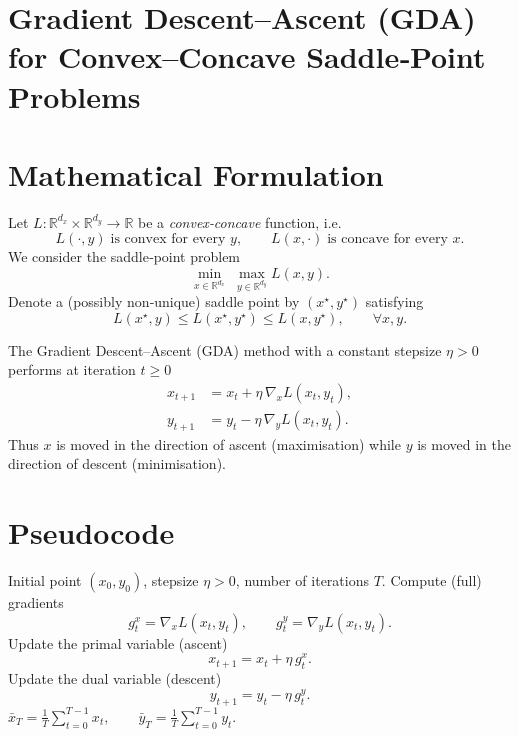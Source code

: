 \documentclass{article}
\begin{document}
\section*{Gradient Descent–Ascent (GDA) for Convex–Concave Saddle‑Point Problems}

\section*{Mathematical Formulation}
Let $L:\mathbb{R}^{d_x}\times\mathbb{R}^{d_y}\rightarrow\mathbb{R}$ be a \emph{convex‑concave} function, i.e.
\[
L(\cdot ,y)\;\text{is convex for every }y,\qquad 
L(x,\cdot )\;\text{is concave for every }x .
\]
We consider the saddle‑point problem
\[
\min_{x\in\mathbb{R}^{d_x}}\;\max_{y\in\mathbb{R}^{d_y}} L(x,y).
\]
Denote a (possibly non‑unique) saddle point by $(x^{\star},y^{\star})$ satisfying
\[
L(x^{\star},y)\le L(x^{\star},y^{\star})\le L(x,y^{\star}),\qquad \forall x,y.
\]

The Gradient Descent–Ascent (GDA) method with a constant stepsize $\eta>0$ performs at iteration $t\ge 0$
\begin{align}
x_{t+1} &= x_t + \eta \,\nabla_{x}L(x_t,y_t),\label{eq:xupdate}\\
y_{t+1} &= y_t - \eta \,\nabla_{y}L(x_t,y_t).\label{eq:yupdate}
\end{align}
Thus $x$ is moved in the direction of ascent (maximisation) while $y$ is moved in the direction of descent (minimisation).  

\section*{Pseudocode}
\begin{algorithm}[H]
\caption{Gradient Descent–Ascent (GDA)}\label{alg:gda}
\begin{algorithmic}[1]
\REQUIRE Initial point $(x_0,y_0)$, stepsize $\eta>0$, number of iterations $T$.
    \STATE Compute (full) gradients 
    \[
    g^x_t=\nabla_x L(x_t,y_t),\qquad 
    g^y_t=\nabla_y L(x_t,y_t).
    \]
    \STATE Update the primal variable (ascent)
    \[
    x_{t+1}=x_t+\eta\, g^x_t .
    \]
    \STATE Update the dual variable (descent)
    \[
    y_{t+1}=y_t-\eta\, g^y_t .
    \]
\ENDFOR
\RETURN $\displaystyle \bar{x}_T=\frac1T\sum_{t=0}^{T-1}x_t,\qquad 
\bar{y}_T=\frac1T\sum_{t=0}^{T-1}y_t$.
\end{algorithmic}
\end{algorithm}
\end{document}
